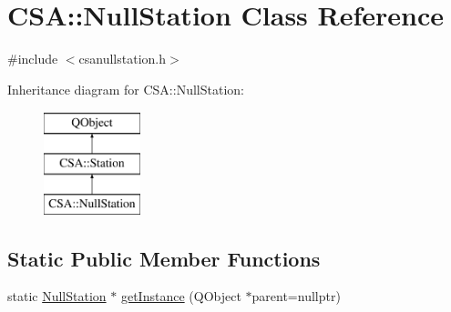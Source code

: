 \hypertarget{classCSA_1_1NullStation}{}\section{C\+SA\+:\+:Null\+Station Class Reference}
\label{classCSA_1_1NullStation}


{\ttfamily \#include $<$csanullstation.\+h$>$}

Inheritance diagram for C\+SA\+:\+:Null\+Station\+:\begin{figure}[H]
\begin{center}
\leavevmode
\includegraphics[height=3.000000cm]{classCSA_1_1NullStation}
\end{center}
\end{figure}
\subsection*{Static Public Member Functions}
\begin{DoxyCompactItemize}
\item 
static \mbox{\hyperlink{classCSA_1_1NullStation}{Null\+Station}} $\ast$ \mbox{\hyperlink{classCSA_1_1NullStation_a5e3c53a70b02d55f910d100574f3e461}{get\+Instance}} (Q\+Object $\ast$parent=nullptr)
\end{DoxyCompactItemize}
